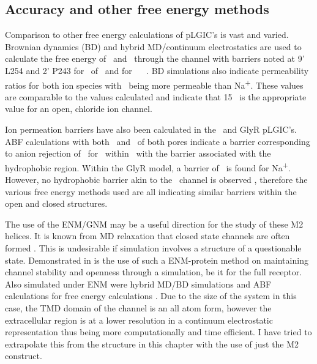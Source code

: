 \subsection*{Accuracy and other free energy methods}

Comparison to other free energy calculations of pLGIC's is vast and varied. Brownian dynamics (BD) and hybrid MD/continuum electrostatics are used to calculate the free energy of \Na\ and \Cl\ through the channel with barriers noted at 9' L254 and 2' P243 for \Na\ of  \kj\ and for \Cl\  \kj\ \cite{Cheng2012}. BD simulations also indicate permeability ratios for both ion species with \Cl\ being  more permeable than Na\textsuperscript{+}. These values are comparable to the values calculated and indicate that 15 \kj\ is the appropriate value for an open, chloride ion channel. 

Ion permeation barriers have also been calculated in the \na\ and GlyR pLGIC's. ABF calculations with both \Na\ and \Cl\ of both pores indicate a barrier corresponding to anion rejection of  \kj\ for \Cl\ within \na\ with the barrier associated with the hydrophobic region. Within the GlyR model, a barrier of   \kj\ is found for Na\textsuperscript{+}. However, no hydrophobic barrier akin to the \na\ channel is observed \cite{Ivanov2007}, therefore the various free energy methods used are all indicating similar barriers within the open and closed structures. 

The use of the ENM/GNM may be a useful direction for the study of these M2 helices. It is known from MD relaxation that closed state channels are often formed \cite{Nury2010,Zhu2010}. This is undesirable if simulation involves a structure of a questionable state. Demonstrated in \cite{Cheng2012} is the use of such a ENM-protein method on maintaining channel stability and openness through a simulation, be it for the full receptor.  Also simulated under ENM were hybrid MD/BD simulations and ABF calculations for free energy calculations \cite{Darve2008,Chipot2005}. Due to the size of the system in this case, the TMD domain of the channel is an all atom form, however the extracellular region is at a lower resolution in a continuum electrostatic representation thus being more computationally and time efficient.  I have tried to extrapolate this from the structure in this chapter with the use of just the M2 construct.

